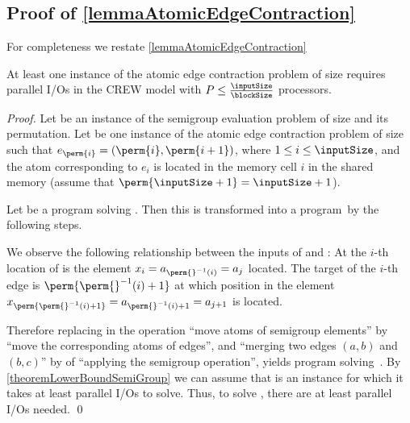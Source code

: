 \documentclass[envcountsame]{llncs}
\def\bOm#1{\printmath{\Omega \left(#1\right)}}
\begin{document}
\subsection{Proof of \autoref{lemmaAtomicEdgeContraction}}\label{appendixAtomicEdgeContraction}

For completeness we restate \autoref{lemmaAtomicEdgeContraction}

\begin{theorem} 
\label{lemmaAtomicEdgeContractionRestate}
At least one instance of the atomic edge contraction problem of size  requires \bOm{\permp{\inputSize,\memorySize,\blockSize}} parallel I/Os in the CREW \linebreak\bridgingPEM model with $P\leq\frac{\inputSize}{\blockSize}$ processors.
\end{theorem}



\begin{proof}
Let \instSE be an instance of the semigroup evaluation problem of size  and \perm{} its permutation. 
Let \instanceAtomicListRanking be one instance of the atomic edge contraction problem of size  such that $e_{\perm{i}}=(\perm{i},\perm{i+1})$, where $1\leq i \leq \inputSize$, and the atom corresponding to $e_i$ is located in the memory cell $i$ in the shared memory (assume that $\perm{\inputSize+1} = \inputSize+1$). 

Let \programAtomicListRanking be a program solving \instanceAtomicListRanking.
Then this is transformed into a program~\progSE by the following steps.

We observe the following relationship between the inputs of \instSE and \instanceAtomicListRanking:
At the $i$-th location of \instSE is the element $x_i=a_{\perm{}^{-1}(i)}=a_j$ located.
The target of the $i$-th edge is $\perm{\perm{}^{-1}(i)+1}$ at which position in \instSE the element $x_{\perm{\perm{}^{-1}(i)+1}}=a_{\perm{}^{-1}(i)+1}=a_{j+1}$ is located.

Therefore replacing in \programAtomicListRanking the operation ``move atoms of semigroup elements'' by ``move the corresponding atoms of edges'', and ``merging two edges $(a,b)$ and~$(b,c)$'' by of ``applying the semigroup operation'', yields program \progSE solving~\instSE.
By \autoref{theoremLowerBoundSemiGroup} we can assume that \instSE is an instance for which it takes at least \bOm{\permp{\inputSize,\memorySize,\blockSize}} parallel I/Os to solve. 
Thus, to solve \instanceAtomicListRanking, there are at least \bOm{\permp{\inputSize,\memorySize,\blockSize}} parallel I/Os needed.
\qed
\end{proof}
\end{document}
